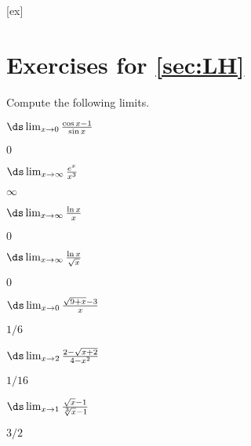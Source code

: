 [ex]
\section*{Exercises for \ref{sec:LH}}

Compute the following limits.

\begin{multicols}{2}[]

\begin{enumialphparenastyle}



\begin{ex} 
$\ds\lim_{x\to 0} {\cos x -1\over \sin x}$
\begin{sol}
 $0$
\end{sol}
\end{ex}

\begin{ex} 
$\ds\lim_{x\to \infty} {e^x\over x^3}$
\begin{sol}
 $\infty$
\end{sol}
\end{ex}

\begin{ex} 
$\ds\lim_{x\to \infty} {\ln x\over x}$
\begin{sol}
 $0$
\end{sol}
\end{ex}

\begin{ex} 
$\ds\lim_{x\to \infty} {\ln x\over \sqrt{x}}$
\begin{sol}
 $0$
\end{sol}
\end{ex}

\begin{ex} 
$\ds\lim_{x\to0}{\sqrt{9+x}-3\over x}$
\begin{sol}
 $1/6$
\end{sol}
\end{ex}

\begin{ex} 
$\ds\lim_{x\to2}{2-\sqrt{x+2}\over 4-x^2}$
\begin{sol}
 $1/16$
\end{sol}
\end{ex}

\begin{ex} 
 $\ds\lim_{x\to1}{\sqrt{x}-1\over \sqrt[3]{x}-1}$
\begin{sol}
 $3/2$
\end{sol}
\end{ex}


\end{enumialphparenastyle}
\end{multicols}
